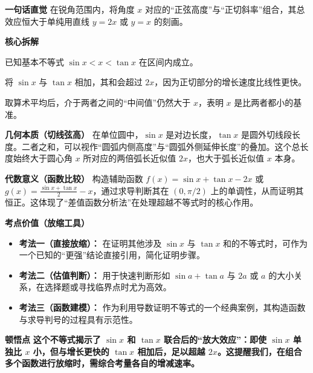 \begin{explanationbox}
\textbf{\textcolor{CExplanation}{一句话直觉}}
在锐角范围内，将角度 $x$ 对应的“正弦高度”与“正切斜率”组合，其总效应恒大于单纯用直线 $y=2x$ 或 $y=x$ 的刻画。

\medskip
\textbf{\textcolor{CExplanation}{核心拆解}}
\begin{description}[style=nextline, leftmargin=2.8em, labelsep=0.5em, itemsep=0.45em]
    \item[\textbf{要点一（独立比较）：}] 已知基本不等式 $\sin x < x < \tan x$ 在区间内成立。
    \item[\textbf{要点二（联合效应）：}] 将 $\sin x$ 与 $\tan x$ 相加，其和会超过 $2x$，因为正切部分的增长速度比线性更快。
    \item[\textbf{要点三（均值效应）：}] 取算术平均后，介于两者之间的“中间值”仍然大于 $x$，表明 $x$ 是比两者都小的基准。
\end{description}

\medskip
\textbf{\textcolor{CExplanation}{几何本质（切线弦高）}}
在单位圆中，$\sin x$ 是对边长度，$\tan x$ 是圆外切线段长度。二者之和，可以视作“圆弧内侧高度”与“圆弧外侧延伸长度”的叠加。这个总长度始终大于圆心角 $x$ 所对应的两倍弧长近似值 $2x$，也大于弧长近似值 $x$ 本身。

\medskip
\textbf{\textcolor{CExplanation}{代数意义（函数比较）}}
构造辅助函数 $f(x) = \sin x + \tan x - 2x$ 或 $g(x) = \frac{\sin x + \tan x}{2} - x$，通过求导判断其在 $(0,\pi/2)$ 上的单调性，从而证明其恒正。这体现了“差值函数分析法”在处理超越不等式时的核心作用。

\medskip
\textbf{\textcolor{CExplanation}{考点价值（放缩工具）}}
\begin{itemize}[leftmargin=*, itemsep=0.5em, topsep=0.4em]
    \item \textbf{考法一（直接放缩）：} 在证明其他涉及 $\sin x$ 与 $\tan x$ 和的不等式时，可作为一个已知的“更强”结论直接引用，简化证明步骤。
    \item \textbf{考法二（估值判断）：} 用于快速判断形如 $\sin a + \tan a$ 与 $2a$ 或 $a$ 的大小关系，在选择题或寻找临界点时尤为高效。
    \item \textbf{考法三（函数建模）：} 作为利用导数证明不等式的一个经典案例，其构造函数与求导判号的过程具有示范性。
\end{itemize}

\medskip
\textbf{\textcolor{CExplanation}{顿悟点}}
\textbf{这个不等式揭示了 $\sin x$ 和 $\tan x$ 联合后的“放大效应”：即使 $\sin x$ 单独比 $x$ 小，但与增长更快的 $\tan x$ 相加后，足以超越 $2x$。这提醒我们，在组合多个函数进行放缩时，需综合考量各自的增减速率。}


\end{explanationbox}
